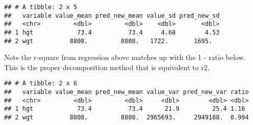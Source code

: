 \documentclass[
]{book}
\newenvironment{Shaded}{\begin{snugshade}}{\end{snugshade}}
\newcommand{\DataTypeTok}[1]{\textcolor[rgb]{0.13,0.29,0.53}{#1}}
\newcommand{\KeywordTok}[1]{\textcolor[rgb]{0.13,0.29,0.53}{\textbf{#1}}}
\newcommand{\NormalTok}[1]{#1}
\newcommand{\OperatorTok}[1]{\textcolor[rgb]{0.81,0.36,0.00}{\textbf{#1}}}
\newcommand{\StringTok}[1]{\textcolor[rgb]{0.31,0.60,0.02}{#1}}
\begin{document}
\begin{Shaded}
\end{Shaded}

\begin{verbatim}
## # A tibble: 2 x 5
##   variable value_mean pred_new_mean value_sd pred_new_sd
##   <chr>         <dbl>         <dbl>    <dbl>       <dbl>
## 1 hgt            73.4          73.4     4.68        4.53
## 2 wgt          8808.         8808.   1722.       1695.
\end{verbatim}

Note the r-square from regression above matches up with the 1 - ratio below. This is the proper decomposition method that is equivalent to r2.

\begin{Shaded}
\end{Shaded}

\begin{verbatim}
## # A tibble: 2 x 6
##   variable value_mean pred_new_mean value_var pred_new_var ratio
##   <chr>         <dbl>         <dbl>     <dbl>        <dbl> <dbl>
## 1 hgt            73.4          73.4      21.9         25.4 1.16 
## 2 wgt          8808.         8808.  2965693.     2949188.  0.994
\end{verbatim}
\end{document}
